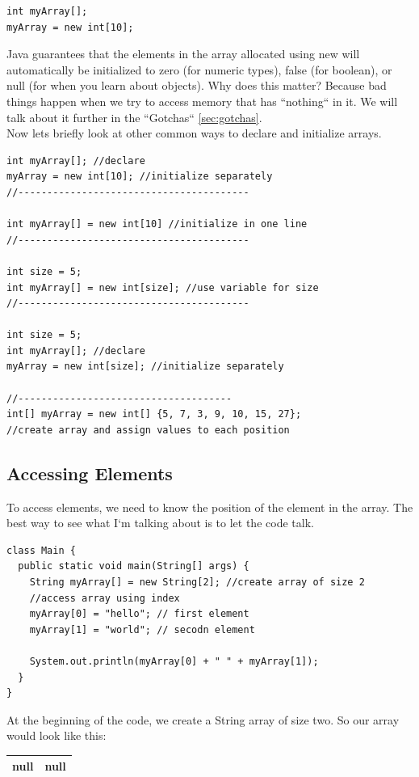 \documentclass[11]{article}
\begin{document}
\begin{lstlisting}
int myArray[];
myArray = new int[10];
\end{lstlisting}
Java guarantees that the elements in the array allocated using new will automatically be initialized to zero (for numeric types), false (for boolean), or null (for when you learn about objects). Why does this matter? Because bad things happen when we try to access memory that has ``nothing`` in it. We will talk about it further in the ``Gotchas``  \autoref{sec:gotchas}. \\

Now lets briefly look at other common ways to declare and initialize arrays.

\begin{lstlisting}
int myArray[]; //declare
myArray = new int[10]; //initialize separately
//----------------------------------------

int myArray[] = new int[10] //initialize in one line
//----------------------------------------

int size = 5;
int myArray[] = new int[size]; //use variable for size
//----------------------------------------

int size = 5;
int myArray[]; //declare
myArray = new int[size]; //initialize separately

//-------------------------------------
int[] myArray = new int[] {5, 7, 3, 9, 10, 15, 27};
//create array and assign values to each position
\end{lstlisting}

\subsection{Accessing Elements}
To access elements, we need to know the position of the element in the array. The best way to see what I`m talking about is to let the code talk.

\begin{lstlisting}
class Main {
  public static void main(String[] args) {
    String myArray[] = new String[2]; //create array of size 2
    //access array using index
    myArray[0] = "hello"; // first element
    myArray[1] = "world"; // secodn element

    System.out.println(myArray[0] + " " + myArray[1]);
  }
}
\end{lstlisting}

At the beginning of the code, we create a String array of size two. So our array would look like this:
\begin{center}
	\begin{tabular}{ | c | c | } \hline
 	null & null  \\   \hline
	\end{tabular}
\end{center}
\end{document}
